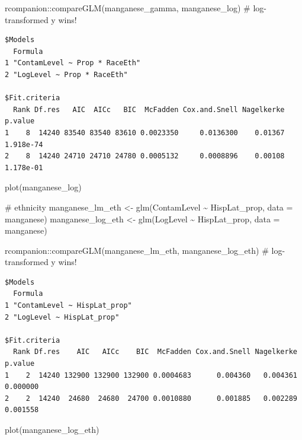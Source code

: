 \documentclass[
  letterpaper,
  DIV=11,
  numbers=noendperiod]{scrartcl}
\newenvironment{Shaded}{\begin{snugshade}}{\end{snugshade}}
\newcommand{\AttributeTok}[1]{\textcolor[rgb]{0.40,0.45,0.13}{#1}}
\newcommand{\CommentTok}[1]{\textcolor[rgb]{0.37,0.37,0.37}{#1}}
\newcommand{\FunctionTok}[1]{\textcolor[rgb]{0.28,0.35,0.67}{#1}}
\newcommand{\NormalTok}[1]{\textcolor[rgb]{0.00,0.23,0.31}{#1}}
\newcommand{\OtherTok}[1]{\textcolor[rgb]{0.00,0.23,0.31}{#1}}
\newcommand{\SpecialCharTok}[1]{\textcolor[rgb]{0.37,0.37,0.37}{#1}}
\begin{document}
\begin{Shaded}
\begin{Highlighting}[]
\NormalTok{rcompanion}\SpecialCharTok{::}\FunctionTok{compareGLM}\NormalTok{(manganese\_gamma, manganese\_log) }\CommentTok{\# log{-}transformed y wins!}
\end{Highlighting}
\end{Shaded}

\begin{verbatim}
$Models
  Formula                       
1 "ContamLevel ~ Prop * RaceEth"
2 "LogLevel ~ Prop * RaceEth"   

$Fit.criteria
  Rank Df.res   AIC  AICc   BIC  McFadden Cox.and.Snell Nagelkerke   p.value
1    8  14240 83540 83540 83610 0.0023350     0.0136300    0.01367 1.918e-74
2    8  14240 24710 24710 24780 0.0005132     0.0008896    0.00108 1.178e-01
\end{verbatim}

\begin{Shaded}
\begin{Highlighting}[]
\FunctionTok{plot}\NormalTok{(manganese\_log)}

\CommentTok{\# ethnicity}
\NormalTok{manganese\_lm\_eth }\OtherTok{\textless{}{-}} \FunctionTok{glm}\NormalTok{(ContamLevel }\SpecialCharTok{\textasciitilde{}}\NormalTok{ HispLat\_prop, }\AttributeTok{data =}\NormalTok{ manganese)}
\NormalTok{manganese\_log\_eth }\OtherTok{\textless{}{-}} \FunctionTok{glm}\NormalTok{(LogLevel }\SpecialCharTok{\textasciitilde{}}\NormalTok{ HispLat\_prop, }\AttributeTok{data =}\NormalTok{ manganese)}

\NormalTok{rcompanion}\SpecialCharTok{::}\FunctionTok{compareGLM}\NormalTok{(manganese\_lm\_eth, manganese\_log\_eth) }\CommentTok{\# log{-}transformed y wins!}
\end{Highlighting}
\end{Shaded}

\begin{verbatim}
$Models
  Formula                     
1 "ContamLevel ~ HispLat_prop"
2 "LogLevel ~ HispLat_prop"   

$Fit.criteria
  Rank Df.res    AIC   AICc    BIC  McFadden Cox.and.Snell Nagelkerke  p.value
1    2  14240 132900 132900 132900 0.0004683      0.004360   0.004361 0.000000
2    2  14240  24680  24680  24700 0.0010880      0.001885   0.002289 0.001558
\end{verbatim}

\begin{Shaded}
\begin{Highlighting}[]
\FunctionTok{plot}\NormalTok{(manganese\_log\_eth)}
\end{Highlighting}
\end{Shaded}
\end{document}
